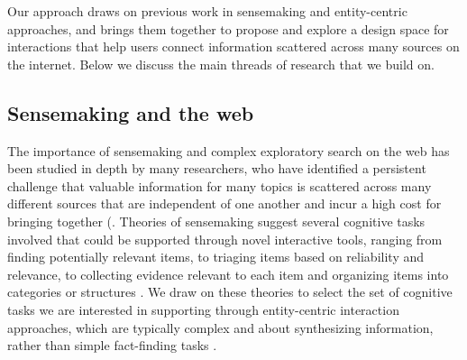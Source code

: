 

Our approach draws on previous work in sensemaking and entity-centric approaches, and brings them together to propose and explore a design space for interactions that help users connect information scattered across many sources on the internet. Below we discuss the main threads of research that we build on.

\subsection{Sensemaking and the web}
The importance of sensemaking and complex exploratory search on the web has been studied in depth by many researchers, who have identified a persistent challenge that valuable information for many topics is scattered across many different sources that are independent of one another and incur a high cost for bringing together (\cite{bhavnani,mar2006exp,marshall1999introducing,kittur2013costs}. Theories of sensemaking suggest several cognitive tasks involved that could be supported through novel interactive tools, ranging from finding potentially relevant items, to triaging items based on reliability and relevance, to collecting evidence relevant to each item and organizing items into categories or structures \cite{russell1993, takayamapirollicard, hearst2013sewing}. We draw on these theories to select the set of cognitive tasks we are interested in supporting through entity-centric interaction approaches, which are typically complex and about synthesizing information, rather than simple fact-finding tasks \cite{mar2006exp, white2006supporting}.

